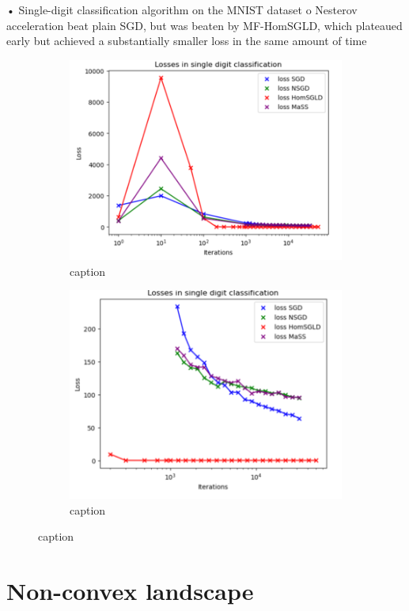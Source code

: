\documentclass{article}
\begin{document}
•	Single-digit classification algorithm on the MNIST dataset
o	Nesterov acceleration beat plain SGD, but was beaten by MF-HomSGLD, which plateaued early but achieved a substantially smaller loss in the same amount of time
     \begin{figure}[H]
 \begin{subfigure}{0.5\textwidth}
   \centering
   \includegraphics[width=0.8\linewidth]{images/Spiliopoulos2019-SGD-algos-single-digit classification.png}
   \caption{ caption}
   \label{fig: description}
 \end{subfigure}%
 \begin{subfigure}{0.5\textwidth}
   \centering
   \includegraphics[width=0.8\linewidth]{images/Spiliopoulos2019-SGD-algos-single-digit-late-time.png}
   \caption{ caption}
   \label{fig:  description}
 \end{subfigure}
 \caption{ caption}
 \label{fig:  label}
 \end{figure} 


\section{Non-convex landscape}
\end{document}
